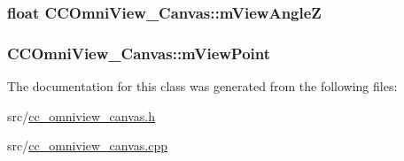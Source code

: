 \hypertarget{a00049_a187edb8b5697afd4ee616aab3400ea0e}{
\subsubsection[{m\-View\-Angle\-Z}]{\setlength{\rightskip}{0pt plus 5cm}float C\-C\-Omni\-View\-\_\-\-Canvas\-::m\-View\-Angle\-Z\hspace{0.3cm}{\ttfamily [private]}}}\label{a00049_a187edb8b5697afd4ee616aab3400ea0e}
\hypertarget{a00049_a68343cb2899d80c9cfc2053855232d3c}{
\subsubsection[{m\-View\-Point}]{ C\-C\-Omni\-View\-\_\-\-Canvas\-::m\-View\-Point\hspace{0.3cm}{\ttfamily [private]}}}\label{a00049_a68343cb2899d80c9cfc2053855232d3c}


The documentation for this class was generated from the following files\-:\begin{DoxyCompactItemize}
\item 
src/\hyperlink{a00185}{cc\-\_\-omniview\-\_\-canvas.\-h}\item 
src/\hyperlink{a00184}{cc\-\_\-omniview\-\_\-canvas.\-cpp}\end{DoxyCompactItemize}
